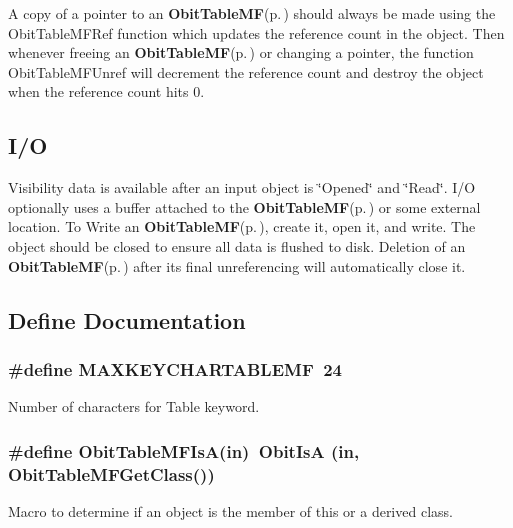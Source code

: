 A copy of a pointer to an {\bf Obit\-Table\-MF}{\rm (p.\,\pageref{structObitTableMF})} should always be made using the Obit\-Table\-MFRef function which updates the reference count in the object. Then whenever freeing an {\bf Obit\-Table\-MF}{\rm (p.\,\pageref{structObitTableMF})} or changing a pointer, the function Obit\-Table\-MFUnref will decrement the reference count and destroy the object when the reference count hits 0.\subsection{I/O}\label{ObitTableMF_8h_ObitTableMFUsage}
Visibility data is available after an input object is \char`\"{}Opened\char`\"{} and \char`\"{}Read\char`\"{}. I/O optionally uses a buffer attached to the {\bf Obit\-Table\-MF}{\rm (p.\,\pageref{structObitTableMF})} or some external location. To Write an {\bf Obit\-Table\-MF}{\rm (p.\,\pageref{structObitTableMF})}, create it, open it, and write. The object should be closed to ensure all data is flushed to disk. Deletion of an {\bf Obit\-Table\-MF}{\rm (p.\,\pageref{structObitTableMF})} after its final unreferencing will automatically close it.

\subsection{Define Documentation}
\subsubsection{\setlength{\rightskip}{0pt plus 5cm}\#define MAXKEYCHARTABLEMF\ 24}\label{ObitTableMF_8h_a0}


Number of characters for Table keyword. 

\subsubsection{\setlength{\rightskip}{0pt plus 5cm}\#define Obit\-Table\-MFIs\-A(in)\ Obit\-Is\-A (in, Obit\-Table\-MFGet\-Class())}\label{ObitTableMF_8h_a3}


Macro to determine if an object is the member of this or a derived class. 

